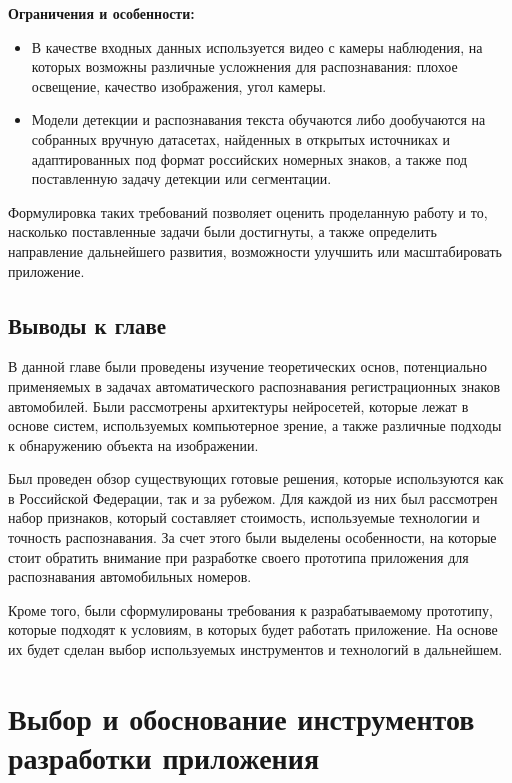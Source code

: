 \documentclass[a4paper,12pt]{article}
\begin{document}
\textbf{Ограничения и особенности:}
\begin{itemize}
\item В качестве входных данных используется видео с камеры наблюдения, на которых возможны различные усложнения для распознавания: плохое освещение, качество изображения, угол камеры.
\item Модели детекции и распознавания текста обучаются либо дообучаются на собранных вручную датасетах, найденных в открытых источниках и адаптированных под формат российских номерных знаков, а также под поставленную задачу детекции или сегментации.
\end{itemize}

Формулировка таких требований позволяет оценить проделанную работу и то, насколько поставленные задачи были достигнуты, а также определить направление дальнейшего развития, возможности улучшить или масштабировать приложение.

\subsection{Выводы к главе}

В данной главе были проведены изучение теоретических основ, потенциально применяемых в задачах автоматического распознавания регистрационных знаков автомобилей.
Были рассмотрены архитектуры нейросетей, которые лежат в основе систем, используемых компьютерное зрение, а также различные подходы к обнаружению объекта на изображении.

Был проведен обзор существующих готовые решения, которые используются как в Российской Федерации, так и за рубежом.
Для каждой из них был рассмотрен набор признаков, который составляет стоимость, используемые технологии и точность распознавания. За счет этого были выделены особенности, на которые стоит обратить внимание при разработке своего прототипа приложения для распознавания автомобильных номеров.

Кроме того, были сформулированы требования к разрабатываемому прототипу, которые подходят к условиям, в которых будет работать приложение. На основе их будет сделан выбор используемых инструментов и технологий в дальнейшем.


\newpage
\section{Выбор и обоснование инструментов разработки приложения}
\end{document}
